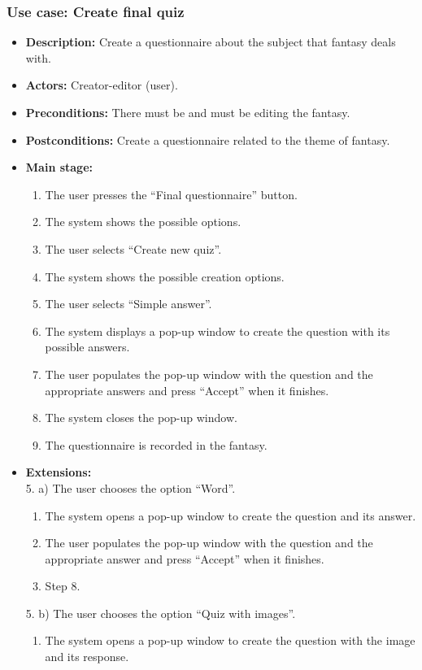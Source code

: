 \subsubsection{Use case: Create final quiz}
\begin{itemize}
	\item \textbf{Description:} Create a questionnaire about the subject that fantasy deals with.
	\item \textbf{Actors:} Creator-editor (user).
	\item \textbf{Preconditions:} There must be and must be editing the fantasy.
	\item \textbf{Postconditions:} Create a questionnaire related to the theme of fantasy.
	\item \textbf{Main stage:}
	\begin{enumerate}
		\item The user presses the ``Final questionnaire'' button.
		\item The system shows the possible options.
		\item The user selects ``Create new quiz''.
		\item The system shows the possible creation options.
		\item The user selects ``Simple answer''.
		\item The system displays a pop-up window to create the question with its possible answers.
		\item The user populates the pop-up window with the question and the appropriate answers and press ``Accept'' when it finishes.
		\item The system closes the pop-up window.
		\item The questionnaire is recorded in the fantasy.
	\end{enumerate}
	\item \textbf{Extensions:} \\5. a) The user chooses the option ``Word''.
	\begin{enumerate}
		\item The system opens a pop-up window to create the question and its answer.
		\item The user populates the pop-up window with the question and the appropriate answer and press ``Accept'' when it finishes.
		\item Step 8.
	\end{enumerate}
	5. b) The user chooses the option ``Quiz with images''.
	\begin{enumerate}
		\item The system opens a pop-up window to create the question with the image and its response.

\end{enumerate}
\end{itemize}
